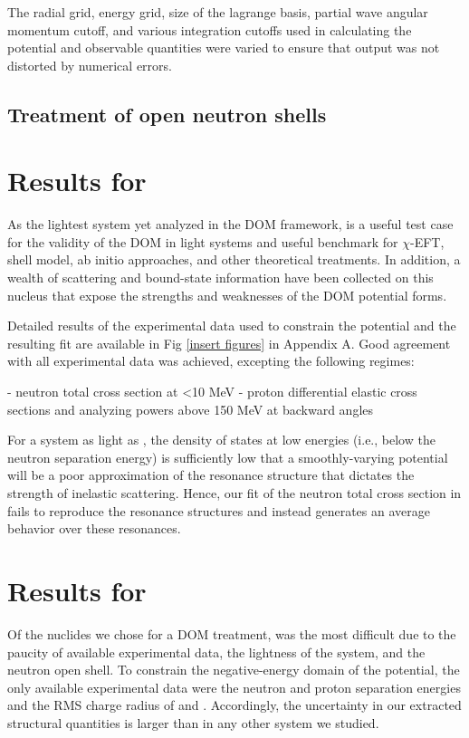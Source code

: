 The radial grid, energy grid, size of the lagrange basis, partial wave angular momentum cutoff, and
various integration cutoffs used in calculating the potential and
observable quantities were varied to ensure that output was not distorted by numerical errors. 

\subsection{Treatment of open neutron shells}

\section{Results for \oSix}
As the lightest system yet analyzed in the DOM framework, \oSix is a useful test case
for the validity of the DOM in light systems and useful benchmark for $\chi$-EFT, shell model, ab
initio approaches, and other theoretical treatments. In addition, a wealth of scattering and
bound-state information have been collected on this nucleus that expose the strengths and
weaknesses of the DOM potential forms.

Detailed results of the experimental data used to constrain the \oSix potential and the resulting
fit are available in Fig \ref{insert figures} in Appendix A. Good agreement with all experimental
data was achieved, excepting the following regimes:

- neutron total cross section at <10 MeV
- proton differential elastic cross sections and analyzing powers above 150 MeV at backward angles

For a system as light as \oSix, the density of states at low energies (i.e., below the neutron
separation energy) is sufficiently low that a smoothly-varying potential will be a poor
approximation of the resonance structure that dictates the strength of inelastic scattering. Hence,
our fit of the neutron total cross section in \oSix fails to reproduce the resonance structures and
instead generates an average behavior over these resonances.

\section{Results for \oEight}
Of the nuclides we chose for a DOM treatment, \oEight was the most difficult due to the paucity of
available experimental data, the lightness of the system, and the neutron open shell. To constrain the negative-energy domain
of the potential, the only available experimental data were the neutron and proton separation
energies and the RMS charge radius of \oEight and \neEight. Accordingly, the uncertainty in our extracted structural quantities is
larger than in any other system we studied.

